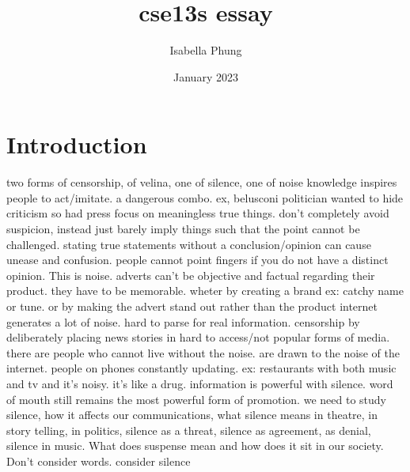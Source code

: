 \documentclass{article}
\title{cse13s essay}
\author{Isabella Phung}
\date{January 2023}
\begin{document}
\maketitle

\section{Introduction}
two forms of censorship, of velina, one of silence, one of noise
knowledge inspires people to act/imitate. a dangerous combo.
ex, belusconi politician wanted to hide criticism so had press focus on meaningless true things.
don't completely avoid suspicion, instead just barely imply things such that the point cannot be challenged.
stating true statements without a conclusion/opinion can cause unease and confusion. people cannot point fingers if you do not have a distinct opinion.
This is noise.
adverts can't be objective and factual regarding their product. they have to be memorable. wheter by creating a brand ex: catchy name or tune. or by making the advert stand out rather than the product
internet generates a lot of noise. hard to parse for real information.
censorship by deliberately placing news stories in hard to access/not popular forms of media.
there are people who cannot live without the noise. are drawn to the noise of the internet. people on phones constantly updating. ex: restaurants with both music and tv and it's noisy. it's like a drug.
information is powerful with silence. word of mouth still remains the most powerful form of promotion.
we need to study silence, how it affects our communications, what silence means in theatre, in story telling, in politics, silence as a threat, silence as agreement, as denial, silence in music. What does suspense mean and how does it sit in our society.
Don't consider words. consider silence
\end{document}

